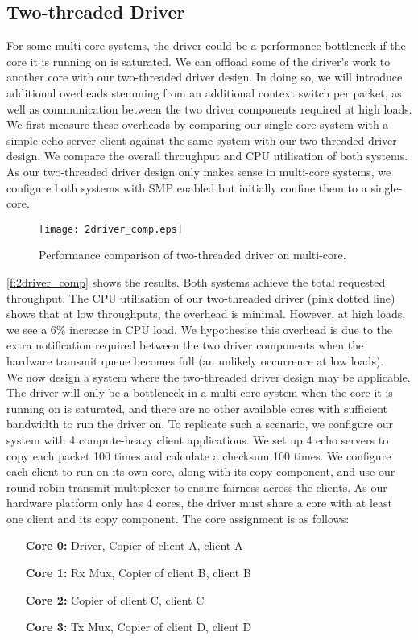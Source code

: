 \subsection{Two-threaded Driver}
For some multi-core systems, the driver could be a performance bottleneck if the core it is running on is saturated. We can offload
some of the driver's work to another core with our two-threaded driver design. In doing so, we will introduce additional overheads
stemming from an additional context switch per packet, as well as communication between the two driver components required at
high loads. We first measure these overheads by comparing our single-core system with a simple echo server client against the 
same system with our two threaded driver design. We compare the overall throughput and CPU utilisation of both systems. As 
our two-threaded driver design only makes sense in multi-core systems, we configure both systems with SMP enabled but 
initially confine them to a single-core.

\begin{figure}[h]
    \centering
    \texttt{[image: 2driver\_comp.eps]}
    \caption{Performance comparison of two-threaded driver on multi-core.}
    \label{f:2driver_comp}
\end{figure}

\autoref{f:2driver_comp} shows the results. Both systems achieve the total requested throughput. The CPU utilisation of our 
two-threaded driver (pink dotted line) shows that at low throughputs, the overhead is minimal. However, at high loads, we
see a 6\% increase in CPU load. We hypothesise this overhead is due to the extra notification required between the two 
driver components when the hardware transmit queue becomes full (an unlikely occurrence at low loads).\\

We now design a system where the two-threaded driver design may be applicable. The driver will only be a bottleneck in a
multi-core system when the core it is running on is saturated, and there are no other available cores with sufficient bandwidth
to run the driver on. To replicate such a scenario, we configure our system with 4 compute-heavy client applications. We set up
4 echo servers to copy each packet 100 times and calculate a checksum 100 times. We configure each client to run on its own
core, along with its copy component, and use our round-robin transmit multiplexer to ensure fairness across the clients. 
As our hardware platform only has 4 cores, the driver must share a core with at least one client and 
its copy component. The core assignment is as follows:
\begin{itemize}
    \item[      \textbf{Core 0:}] Driver, Copier of client A, client A
    \item[      \textbf{Core 1:}] Rx Mux, Copier of client B, client B
    \item[      \textbf{Core 2:}] Copier of client C, client C
    \item[      \textbf{Core 3:}] Tx Mux, Copier of client D, client D
\end{itemize}

